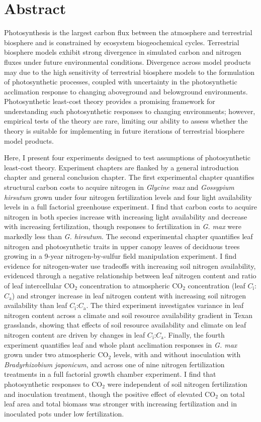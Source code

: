 \documentclass{ttuthes2007}
\begin{document}
\chapter{\textbf{Abstract}}
\noindent Photosynthesis is the largest carbon flux between the atmosphere and terrestrial biosphere and is constrained by ecosystem biogeochemical cycles. Terrestrial biosphere models exhibit strong divergence in simulated carbon and nitrogen fluxes under future environmental conditions. Divergence across model products may due to the high sensitivity of terrestrial biosphere models to the formulation of photosynthetic processes, coupled with uncertainty in the photosynthetic acclimation response to changing aboveground and belowground environments. Photosynthetic least-cost theory provides a promising framework for understanding such photosynthetic responses to changing environments; however, empirical tests of the theory are rare, limiting our ability to assess whether the theory is suitable for implementing in future iterations of terrestrial biosphere model products.

Here, I present four experiments designed to test assumptions of photosynthetic least-cost theory. Experiment chapters are flanked by a general introduction chapter and general conclusion chapter. The first experimental chapter quantifies structural carbon costs to acquire nitrogen in \textit{Glycine max} and \textit{Gossypium hirsutum} grown under four nitrogen fertilization levels and four light availability levels in a full factorial greenhouse experiment. I find that carbon costs to acquire nitrogen in both species increase with increasing light availability and decrease with increasing fertilization, though responses to fertilization in \textit{G. max} were markedly less than \textit{G. hirsutum}. The second experimental chapter quantifies leaf nitrogen and photosynthetic traits in upper canopy leaves of deciduous trees growing in a 9-year nitrogen-by-sulfur field manipulation experiment. I find evidence for nitrogen-water use tradeoffs with increasing soil nitrogen availability, evidenced through a negative relationship between leaf nitrogen content and ratio of leaf intercellular CO$_2$ concentration to atmospheric CO$_2$ concentration (leaf $C_\mathrm{i}$:$C_\mathrm{a}$) and stronger increase in leaf nitrogen content with increasing soil nitrogen availability than leaf $C_\mathrm{i}$:$C_\mathrm{a}$. The third experiment investigates variance in leaf nitrogen content across a climate and soil resource availability gradient in Texan grasslands, showing that effects of soil resource availability and climate on leaf nitrogen content are driven by changes in leaf $C_\mathrm{i}$:$C_\mathrm{a}$. Finally, the fourth experiment quantifies leaf and whole plant acclimation responses in \textit{G. max} grown under two atmospheric CO$_2$ levels, with and without inoculation with \textit{Bradyrhizobium japonicum}, and across one of nine nitrogen fertilization treatments in a full factorial growth chamber experiment. I find that photosynthetic responses to CO$_2$ were independent of soil nitrogen fertilization and inoculation treatment, though the positive effect of elevated CO$_2$ on total leaf area and total biomass was stronger with increasing fertilization and in inoculated pots under low fertilization.
\end{document}
